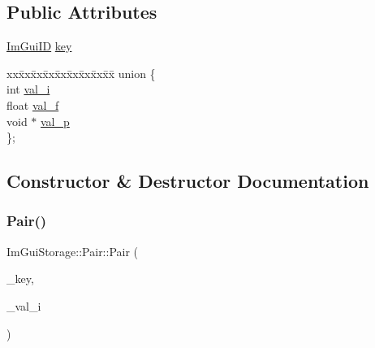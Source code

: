 \subsection*{Public Attributes}
\begin{DoxyCompactItemize}
\item 
\mbox{\hyperlink{imgui_8h_a1785c9b6f4e16406764a85f32582236f}{Im\+Gui\+ID}} \mbox{\hyperlink{struct_im_gui_storage_1_1_pair_a5b37b692d2eacc7f4f5b6f233359e6ce}{key}}
\item 
\begin{tabbing}
xx\=xx\=xx\=xx\=xx\=xx\=xx\=xx\=xx\=\kill
union \{\\
\>int \mbox{\hyperlink{struct_im_gui_storage_1_1_pair_ad6d89ae042ab3e6db8b1e1cf47b05c5e}{val\_i}}\\
\>float \mbox{\hyperlink{struct_im_gui_storage_1_1_pair_adf93d369480896f4d4b6dbf707de7bc8}{val\_f}}\\
\>void $\ast$ \mbox{\hyperlink{struct_im_gui_storage_1_1_pair_ac678b2f593c5de682b84ef41e9f30b06}{val\_p}}\\
\}; \\

\end{tabbing}\end{DoxyCompactItemize}


\subsection{Constructor \& Destructor Documentation}
\mbox{\label{struct_im_gui_storage_1_1_pair_a37542a22048f0af35e5a6beda6900a0e}} 
\subsubsection{\texorpdfstring{Pair()}{Pair()}\hspace{0.1cm}{\footnotesize\ttfamily [1/3]}}
{\footnotesize\ttfamily Im\+Gui\+Storage\+::\+Pair\+::\+Pair (\begin{DoxyParamCaption}\item[{\mbox{\hyperlink{imgui_8h_a1785c9b6f4e16406764a85f32582236f}{Im\+Gui\+ID}}}]{\+\_\+key,  }\item[{int}]{\+\_\+val\+\_\+i }\end{DoxyParamCaption})\hspace{0.3cm}{\ttfamily [inline]}}

